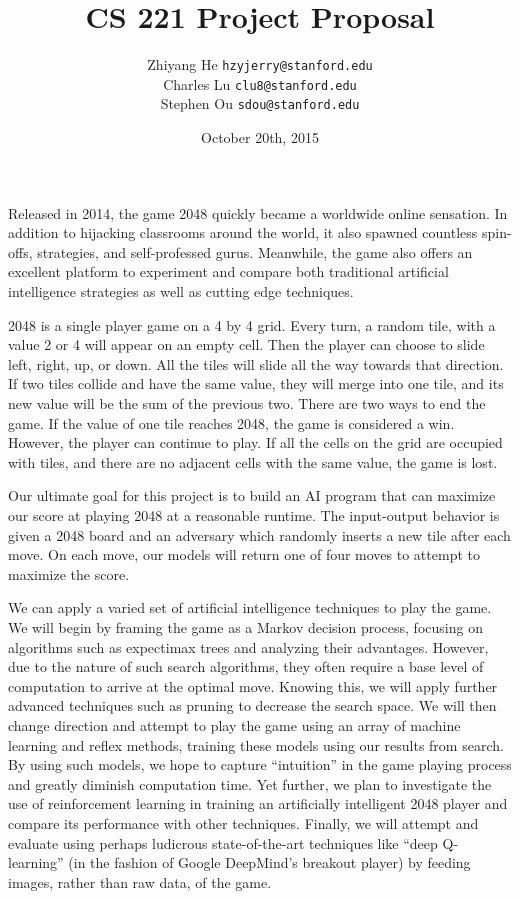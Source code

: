 \documentclass{article}
\title{CS 221 Project Proposal}
\author{Zhiyang He \texttt{hzyjerry@stanford.edu} \\ Charles Lu \texttt{clu8@stanford.edu} \\ Stephen Ou \texttt{sdou@stanford.edu}}
\date{October 20th, 2015}
\begin{document}
\maketitle

Released in 2014, the game 2048 quickly became a worldwide online sensation. In addition to hijacking classrooms around the world, it also spawned countless spin-offs, strategies, and self-professed gurus. Meanwhile, the game also offers an excellent platform to experiment and compare both traditional artificial intelligence strategies as well as cutting edge techniques. 

2048 is a single player game on a 4 by 4 grid. Every turn, a random tile, with a value 2 or 4 will appear on an empty cell. Then the player can choose to slide left, right, up, or down. All the tiles will slide all the way towards that direction. If two tiles collide and have the same value, they will merge into one tile, and its new value will be the sum of the previous two. There are two ways to end the game. If the value of one tile reaches 2048, the game is considered a win. However, the player can continue to play. If all the cells on the grid are occupied with tiles, and there are no adjacent cells with the same value, the game is lost.

Our ultimate goal for this project is to build an AI program that can maximize our score at playing 2048 at a reasonable runtime. The input-output behavior is given a 2048 board and an adversary which randomly inserts a new tile after each move. On each move, our models will return one of four moves to attempt to maximize the score.

We can apply a varied set of artificial intelligence techniques to play the game. We will begin by framing the game as a Markov decision process, focusing on algorithms such as expectimax trees and analyzing their advantages. However, due to the nature of such search algorithms, they often require a base level of computation to arrive at the optimal move. Knowing this, we will apply further advanced techniques such as pruning to decrease the search space. We will then change direction and attempt to play the game using an array of machine learning and reflex methods, training these models using our results from search. By using such models, we hope to capture “intuition” in the game playing process and greatly diminish computation time. Yet further, we plan to investigate the use of reinforcement learning in training an artificially intelligent 2048 player and compare its performance with other techniques. Finally, we will attempt and evaluate using perhaps ludicrous state-of-the-art techniques like “deep Q-learning” (in the fashion of Google DeepMind’s breakout player) by feeding images, rather than raw data, of the game. 
\end{document}
